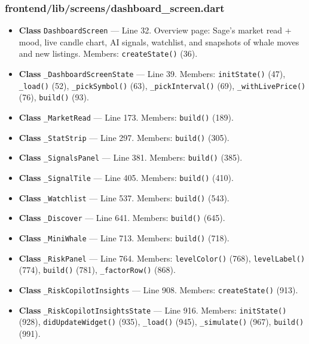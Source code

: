 \subsubsection*{frontend/lib/screens/dashboard\_screen.dart}
\begin{itemize}[nosep,leftmargin=1.5em]
\item \textbf{Class} \texttt{DashboardScreen} --- Line 32. Overview page: Sage's market read + mood, live candle chart, AI signals, watchlist, and snapshots of whale moves and new listings. Members: \texttt{createState(\allowbreak{})} (36).
\item \textbf{Class} \texttt{\_\allowbreak{}DashboardScreenState} --- Line 39. Members: \texttt{initState(\allowbreak{})} (47), \texttt{\_\allowbreak{}load(\allowbreak{})} (52), \texttt{\_\allowbreak{}pickSymbol(\allowbreak{})} (63), \texttt{\_\allowbreak{}pickInterval(\allowbreak{})} (69), \texttt{\_\allowbreak{}withLivePrice(\allowbreak{})} (76), \texttt{build(\allowbreak{})} (93).
\item \textbf{Class} \texttt{\_\allowbreak{}MarketRead} --- Line 173. Members: \texttt{build(\allowbreak{})} (189).
\item \textbf{Class} \texttt{\_\allowbreak{}StatStrip} --- Line 297. Members: \texttt{build(\allowbreak{})} (305).
\item \textbf{Class} \texttt{\_\allowbreak{}SignalsPanel} --- Line 381. Members: \texttt{build(\allowbreak{})} (385).
\item \textbf{Class} \texttt{\_\allowbreak{}SignalTile} --- Line 405. Members: \texttt{build(\allowbreak{})} (410).
\item \textbf{Class} \texttt{\_\allowbreak{}Watchlist} --- Line 537. Members: \texttt{build(\allowbreak{})} (543).
\item \textbf{Class} \texttt{\_\allowbreak{}Discover} --- Line 641. Members: \texttt{build(\allowbreak{})} (645).
\item \textbf{Class} \texttt{\_\allowbreak{}MiniWhale} --- Line 713. Members: \texttt{build(\allowbreak{})} (718).
\item \textbf{Class} \texttt{\_\allowbreak{}RiskPanel} --- Line 764. Members: \texttt{levelColor(\allowbreak{})} (768), \texttt{levelLabel(\allowbreak{})} (774), \texttt{build(\allowbreak{})} (781), \texttt{\_\allowbreak{}factorRow(\allowbreak{})} (868).
\item \textbf{Class} \texttt{\_\allowbreak{}RiskCopilotInsights} --- Line 908. Members: \texttt{createState(\allowbreak{})} (913).
\item \textbf{Class} \texttt{\_\allowbreak{}RiskCopilotInsightsState} --- Line 916. Members: \texttt{initState(\allowbreak{})} (928), \texttt{didUpdateWidget(\allowbreak{})} (935), \texttt{\_\allowbreak{}load(\allowbreak{})} (945), \texttt{\_\allowbreak{}simulate(\allowbreak{})} (967), \texttt{build(\allowbreak{})} (991).

\end{itemize}
